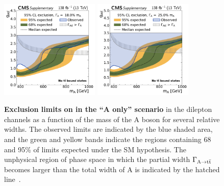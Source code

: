 \begin{figure}[!ph]
    \\
    \includegraphics[width=0.42\textwidth]{figures/ah/lim1D/smtt/ll/A_limit_w18p0_g-scan_highrange.pdf}%
    \hspace*{0.05\textwidth}%
    \includegraphics[width=0.42\textwidth]{figures/ah/lim1D/smtt/ll/A_limit_w25p0_g-scan_highrange.pdf}
    \caption{%
        \textbf{Exclusion limits on \gAtt in the ``A only'' scenario} in the dilepton channels as a function of the mass of the A boson for several relative widths.
        The observed limits are indicated by the blue shaded area, and the green and yellow bands indicate the regions containing 68 and 95\% of limits expected under the SM hypothesis.
        The unphysical region of phase space in which the partial width $\Gamma_{\mathrm{A \rightarrow \mathrm{t \bar{t}}}}$ becomes larger than the total width of A is indicated by the hatched line~\cite{CMS:HIG-22-013}.
    }
    \label{fig:ah:limit_1D_a_smtt}
\end{figure}
    
